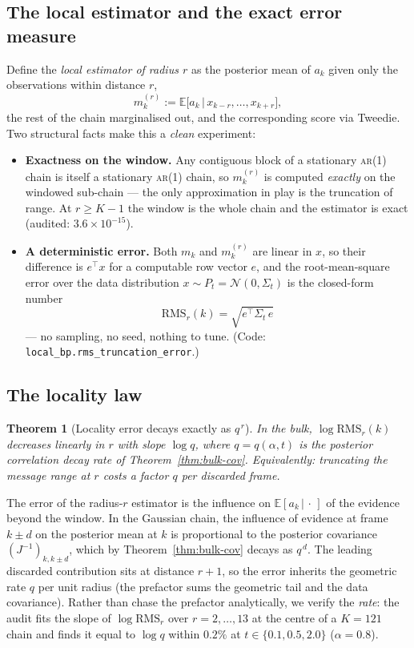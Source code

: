 \documentclass[11pt]{article}
\newtheorem{theorem}[proposition]{Theorem}
\theoremstyle{definition}
\newcommand{\N}{\mathcal{N}}
\newcommand{\E}{\mathbb{E}}
\newcommand{\Sig}{\Sigma}
\newcommand{\given}{\,|\,}
\newcommand{\T}{^{\!\top}}
\begin{document}
\subsection{The local estimator and the exact error measure}

Define the \emph{local estimator of radius $r$} as the posterior mean of
$a_k$ given only the observations within distance $r$,
\[
  m^{(r)}_k:=\E\big[a_k\,\big|\,x_{k-r},\dots,x_{k+r}\big],
\]
the rest of the chain marginalised out, and the corresponding score via
Tweedie. Two structural facts make this a \emph{clean} experiment:
\begin{itemize}[leftmargin=1.6em, itemsep=1pt]
\item \textbf{Exactness on the window.} Any contiguous block of a stationary
\textsc{ar}(1) chain is itself a stationary \textsc{ar}(1) chain, so
$m^{(r)}_k$ is computed \emph{exactly} on the windowed sub-chain --- the only
approximation in play is the truncation of range. At $r\ge K-1$ the window is
the whole chain and the estimator is exact (audited: $3.6\times10^{-15}$).
\item \textbf{A deterministic error.} Both $m_k$ and $m^{(r)}_k$ are linear
in $x$, so their difference is $e\T x$ for a computable row vector $e$, and
the root-mean-square error over the data distribution $x\sim P_t=\N(0,\Sig_t)$
is the closed-form number
\[
  \mathrm{RMS}_r(k)=\sqrt{e\T\Sig_t\,e}
\]
--- no sampling, no seed, nothing to tune. (Code:
\texttt{local\_bp.rms\_truncation\_error}.)
\end{itemize}

\subsection{The locality law}

\begin{theorem}[Locality error decays exactly as $q^{\,r}$]\label{thm:locality}
In the bulk, $\log\mathrm{RMS}_r(k)$ decreases linearly in $r$ with slope
$\log q$, where $q=q(\alpha,t)$ is the posterior correlation decay rate of
Theorem~\ref{thm:bulk-cov}. Equivalently: truncating the message range at $r$
costs a factor $q$ per discarded frame.
\end{theorem}

\begin{derivation}
The error of the radius-$r$ estimator is the influence on
$\E[a_k\given\cdot\,]$ of the evidence beyond the window. In the Gaussian
chain, the influence of evidence at frame $k\pm d$ on the posterior mean at
$k$ is proportional to the posterior covariance $(J^{-1})_{k,k\pm d}$, which
by Theorem~\ref{thm:bulk-cov} decays as $q^{\,d}$. The leading discarded
contribution sits at distance $r+1$, so the error inherits the geometric rate
$q$ per unit radius (the prefactor sums the geometric tail and the data
covariance). Rather than chase the prefactor analytically, we verify the
\emph{rate}: the audit fits the slope of $\log\mathrm{RMS}_r$ over
$r=2,\dots,13$ at the centre of a $K=121$ chain and finds it equal to
$\log q$ within $0.2\%$ at $t\in\{0.1,0.5,2.0\}$ ($\alpha=0.8$).
\end{derivation}
\end{document}
